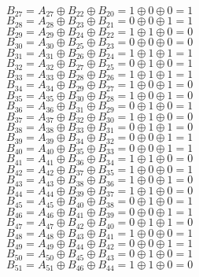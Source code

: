 $B_{27}=A_{27}\oplus B_{22}\oplus B_{20}=1\oplus 0\oplus 0=1$\\
$B_{28}=A_{28}\oplus B_{23}\oplus B_{21}=0\oplus 0\oplus 1=1$\\
$B_{29}=A_{29}\oplus B_{24}\oplus B_{22}=1\oplus 1\oplus 0=0$\\
$B_{30}=A_{30}\oplus B_{25}\oplus B_{23}=0\oplus 0\oplus 0=0$\\
$B_{31}=A_{31}\oplus B_{26}\oplus B_{24}=1\oplus 1\oplus 1=1$\\
$B_{32}=A_{32}\oplus B_{27}\oplus B_{25}=0\oplus 1\oplus 0=1$\\
$B_{33}=A_{33}\oplus B_{28}\oplus B_{26}=1\oplus 1\oplus 1=1$\\
$B_{34}=A_{34}\oplus B_{29}\oplus B_{27}=1\oplus 0\oplus 1=0$\\
$B_{35}=A_{35}\oplus B_{30}\oplus B_{28}=1\oplus 0\oplus 1=0$\\
$B_{36}=A_{36}\oplus B_{31}\oplus B_{29}=0\oplus 1\oplus 0=1$\\
$B_{37}=A_{37}\oplus B_{32}\oplus B_{30}=1\oplus 1\oplus 0=0$\\
$B_{38}=A_{38}\oplus B_{33}\oplus B_{31}=0\oplus 1\oplus 1=0$\\
$B_{39}=A_{39}\oplus B_{34}\oplus B_{32}=0\oplus 0\oplus 1=1$\\
$B_{40}=A_{40}\oplus B_{35}\oplus B_{33}=0\oplus 0\oplus 1=1$\\
$B_{41}=A_{41}\oplus B_{36}\oplus B_{34}=1\oplus 1\oplus 0=0$\\
$B_{42}=A_{42}\oplus B_{37}\oplus B_{35}=1\oplus 0\oplus 0=1$\\
$B_{43}=A_{43}\oplus B_{38}\oplus B_{36}=1\oplus 0\oplus 1=0$\\
$B_{44}=A_{44}\oplus B_{39}\oplus B_{37}=1\oplus 1\oplus 0=0$\\
$B_{45}=A_{45}\oplus B_{40}\oplus B_{38}=0\oplus 1\oplus 0=1$\\
$B_{46}=A_{46}\oplus B_{41}\oplus B_{39}=0\oplus 0\oplus 1=1$\\
$B_{47}=A_{47}\oplus B_{42}\oplus B_{40}=0\oplus 1\oplus 1=0$\\
$B_{48}=A_{48}\oplus B_{43}\oplus B_{41}=1\oplus 0\oplus 0=1$\\
$B_{49}=A_{49}\oplus B_{44}\oplus B_{42}=0\oplus 0\oplus 1=1$\\
$B_{50}=A_{50}\oplus B_{45}\oplus B_{43}=0\oplus 1\oplus 0=1$\\
$B_{51}=A_{51}\oplus B_{46}\oplus B_{44}=1\oplus 1\oplus 0=0$\\
